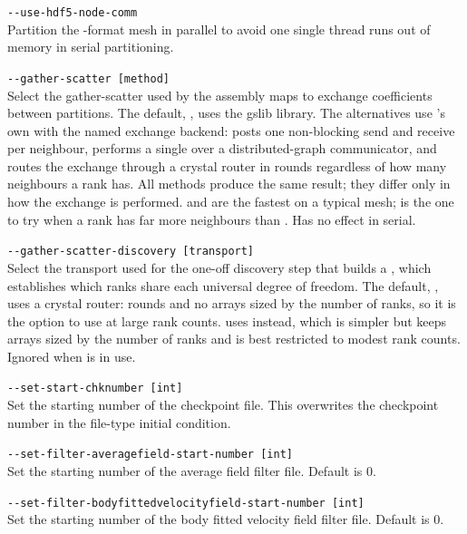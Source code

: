 \lstinline[style=BashInputStyle]{--use-hdf5-node-comm}\\
\hangindent=1.5cm
Partition the -format mesh in parallel to avoid one single thread runs out of memory in serial partitioning.

\lstinline[style=BashInputStyle]{--gather-scatter [method]}\\
\hangindent=1.5cm
Select the gather-scatter used by the assembly maps to exchange coefficients
between partitions. The default, , uses the gslib library.
The alternatives use \nekpp{}'s own  with the named
exchange backend:  posts one non-blocking send and receive
per neighbour,  performs a single
 over a distributed-graph communicator, and
 routes the exchange through a crystal router in
 rounds regardless of how many neighbours a rank has. All
methods produce the same result; they differ only in how the exchange is
performed.  and  are the fastest on a
typical mesh;  is the one to try when a rank has far more
neighbours than . Has no effect in serial.

\lstinline[style=BashInputStyle]{--gather-scatter-discovery [transport]}\\
\hangindent=1.5cm
Select the transport used for the one-off discovery step that builds a
, which establishes which ranks share each universal
degree of freedom. The default, , uses a crystal router:
 rounds and no arrays sized by the number of ranks, so it is
the option to use at large rank counts.  uses
 instead, which is simpler but keeps arrays sized by the
number of ranks and is best restricted to modest rank counts. Ignored when
 is in use.

\lstinline[style=BashInputStyle]{--set-start-chknumber [int]}\\
\hangindent=1.5cm
Set the starting number of the checkpoint file. This overwrites the checkpoint number in the file-type initial condition.

\lstinline[style=BashInputStyle]{--set-filter-averagefield-start-number [int]}\\
\hangindent=1.5cm
Set the starting number of the average field filter file. Default is 0.

\lstinline[style=BashInputStyle]{--set-filter-bodyfittedvelocityfield-start-number [int]}\\
\hangindent=1.5cm
Set the starting number of the body fitted velocity field filter file. Default is 0.

